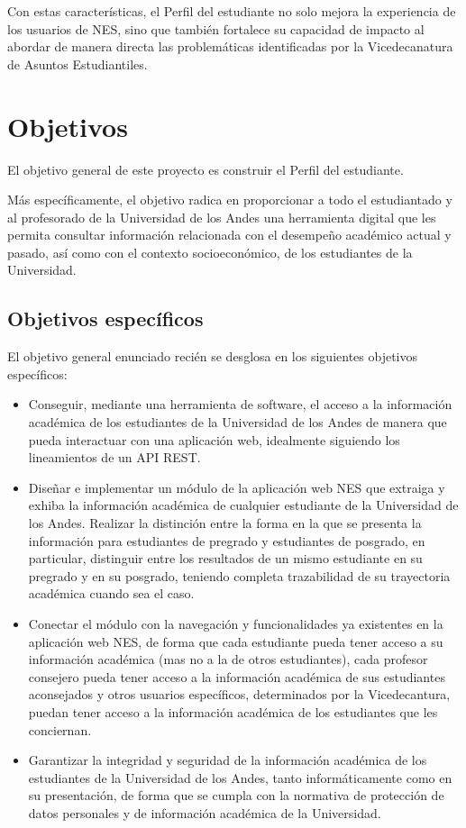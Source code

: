 Con estas características, el Perfil del estudiante no solo mejora la experiencia de los usuarios de NES, sino que también fortalece su capacidad de impacto al abordar de manera directa las problemáticas identificadas por la Vicedecanatura de Asuntos Estudiantiles.

\section{Objetivos}

El objetivo general de este proyecto es construir el Perfil del estudiante. 

Más específicamente, el objetivo radica en proporcionar a todo el estudiantado y al profesorado de la Universidad de los Andes una herramienta digital que les permita consultar información relacionada con el desempeño académico actual y pasado, así como con el contexto socioeconómico, de los estudiantes de la Universidad.

\subsection{Objetivos específicos}

El objetivo general enunciado recién se desglosa en los siguientes objetivos específicos:
\begin{itemize}
	\item Conseguir, mediante una herramienta de software, el acceso a la información académica de los estudiantes de la Universidad de los Andes de manera que pueda interactuar con una aplicación web, idealmente siguiendo los lineamientos de un API REST.
	\item Diseñar e implementar un módulo de la aplicación web NES que extraiga y exhiba la información académica de cualquier estudiante de la Universidad de los Andes. Realizar la distinción entre la forma en la que se presenta la información para estudiantes de pregrado y estudiantes de posgrado, en particular, distinguir entre los resultados de un mismo estudiante en su pregrado y en su posgrado, teniendo completa trazabilidad de su trayectoria académica cuando sea el caso.
	\item Conectar el módulo con la navegación y funcionalidades ya existentes en la aplicación web NES, de forma que cada estudiante pueda tener acceso a su información académica (mas no a la de otros estudiantes), cada profesor consejero pueda tener acceso a la información académica de sus estudiantes aconsejados y otros usuarios específicos, determinados por la Vicedecantura, puedan tener acceso a la información académica de los estudiantes que les conciernan.
	\item Garantizar la integridad y seguridad de la información académica de los estudiantes de la Universidad de los Andes, tanto informáticamente como en su presentación, de forma que se cumpla con la normativa de protección de datos personales y de información académica de la Universidad.
\end{itemize}

